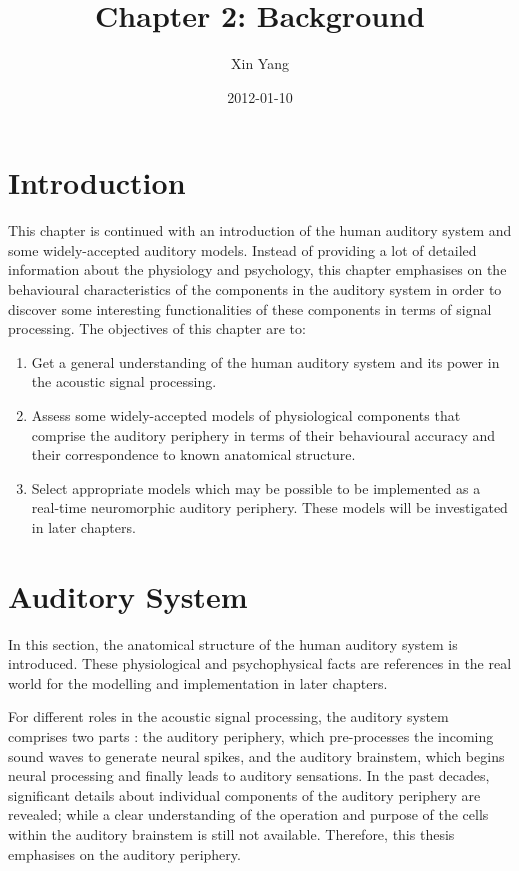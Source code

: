 \documentclass[11pt]{article}
\title{Chapter 2: Background}
\author{Xin Yang}
\date{2012-01-10}
\begin{document}
\maketitle

\setcounter{tocdepth}{3}
\tableofcontents
\vspace*{1cm}

\printnomenclature
{}

\section{Introduction}
\label{sec-1}
\label{sec:ch2-introduction}

This chapter is continued with an introduction of the human auditory
system and some widely-accepted auditory models. Instead of providing
a lot of detailed information about the physiology and psychology,
this chapter emphasises on the behavioural characteristics of the
components in the auditory system in order to discover some
interesting functionalities of these components in terms of signal
processing. The objectives of this chapter are to:

\begin{enumerate}
\item Get a general understanding of the human auditory system and its
   power in the acoustic signal processing.
\item Assess some widely-accepted models of physiological components that
   comprise the auditory periphery in terms of their behavioural
   accuracy and their correspondence to known anatomical structure.
\item Select appropriate models which may be possible to be implemented
   as a real-time neuromorphic auditory periphery. These models will
   be investigated in later chapters.
\end{enumerate}
\section{Auditory System}
\label{sec-2}
\label{sec:ch2-auditory-system}

In this section, the anatomical structure of the human auditory system
is introduced. These physiological and psychophysical facts are
references in the real world for the modelling and implementation in
later chapters.

For different roles in the acoustic signal processing, the auditory
system comprises two parts \cite{Pickles2008}: the auditory periphery,
which pre-processes the incoming sound waves to generate neural
spikes, and the auditory brainstem, which begins neural processing and
finally leads to auditory sensations. In the past decades, significant
details about individual components of the auditory periphery are
revealed; while a clear understanding of the operation and purpose of
the cells within the auditory brainstem is still not available.
Therefore, this thesis emphasises on the auditory periphery.
\end{document}
